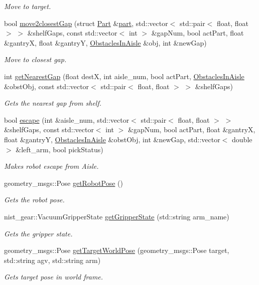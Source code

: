 \begin{DoxyCompactItemize}
\begin{DoxyCompactList}\small\item\em Move to target. \end{DoxyCompactList}\item 
bool \hyperlink{classGantryControl_aa6ba7baf102ac7e39d68b2ae2492f9a5}{move2closest\+Gap} (struct \hyperlink{structPart}{Part} \&\hyperlink{utils_8h_a67ee3a5b9091664130eca8efc8b97ab9}{part}, std\+::vector$<$ std\+::pair$<$ float, float $>$ $>$ \&shelf\+Gaps, const std\+::vector$<$ int $>$ \&gap\+Num, bool act\+Part, float \&gantryX, float \&gantryY, \hyperlink{classObstaclesInAisle}{Obstacles\+In\+Aisle} \&obj, int \&new\+Gap)
\begin{DoxyCompactList}\small\item\em Move to closest gap. \end{DoxyCompactList}\item 
int \hyperlink{classGantryControl_ab475e912ab1ea0d13efc10078695102e}{get\+Nearest\+Gap} (float destX, int aisle\+\_\+num, bool act\+Part, \hyperlink{classObstaclesInAisle}{Obstacles\+In\+Aisle} \&obst\+Obj, const std\+::vector$<$ std\+::pair$<$ float, float $>$ $>$ \&shelf\+Gaps)
\begin{DoxyCompactList}\small\item\em Gets the nearest gap from shelf. \end{DoxyCompactList}\item 
bool \hyperlink{classGantryControl_aa014dd433af4fc580d38639c6353e7b8}{escape} (int \&aisle\+\_\+num, std\+::vector$<$ std\+::pair$<$ float, float $>$ $>$ \&shelf\+Gaps, const std\+::vector$<$ int $>$ \&gap\+Num, bool act\+Part, float \&gantryX, float \&gantryY, \hyperlink{classObstaclesInAisle}{Obstacles\+In\+Aisle} \&obst\+Obj, int \&new\+Gap, std\+::vector$<$ double $>$ \&left\+\_\+arm, bool pick\+Status)
\begin{DoxyCompactList}\small\item\em Makes robot escape from Aisle. \end{DoxyCompactList}\item 
geometry\+\_\+msgs\+::\+Pose \hyperlink{classGantryControl_aefa12231efd7960bc201638f832d9478}{get\+Robot\+Pose} ()
\begin{DoxyCompactList}\small\item\em Gets the robot pose. \end{DoxyCompactList}\item 
nist\+\_\+gear\+::\+Vacuum\+Gripper\+State \hyperlink{classGantryControl_a986691834604135cf47b1c070f8d915e}{get\+Gripper\+State} (std\+::string arm\+\_\+name)
\begin{DoxyCompactList}\small\item\em Gets the gripper state. \end{DoxyCompactList}\item 
geometry\+\_\+msgs\+::\+Pose \hyperlink{classGantryControl_ae92c2fdeba302399425c1abafc76f973}{get\+Target\+World\+Pose} (geometry\+\_\+msgs\+::\+Pose target, std\+::string agv, std\+::string arm)
\begin{DoxyCompactList}\small\item\em Gets target pose in world frame. \end{DoxyCompactList}\end{DoxyCompactItemize}
